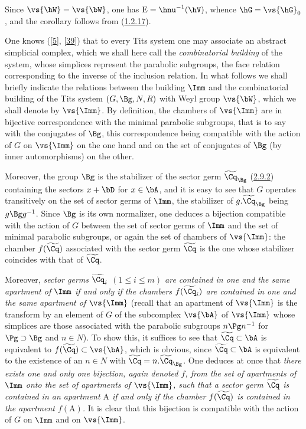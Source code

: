 \documentclass[12pt,a4paper,oneside,english]{smfart}
\makeatletter
\newcommand{\btanchor}[1]{\leavevmode\Hy@raisedlink{\hypertarget{bt:#1}{}}}
\newcommand{\btpageanchor}[1]{\Hy@raisedlink{\hypertarget{p:#1}{}}}
\newcommand{\btref}[1]{\hyperlink{bt:#1}{#1}}
\newcommand{\btbib}[1]{\hyperlink{bib:#1}{#1}}
\newcommand{\btpage}[1]{\marginnote{p.~#1}\btpageanchor{#1}}
\newcommand{\pg}[1]{\btpage{#1}}
\theoremstyle{definition}
\theoremstyle{bt}
\makeatother
\begin{document}
Since $\vs{\hW}=\vs{\bW}$, one has $\mathrm{E}=\hnu^{-1}(\hV)$, whence
$\hG=\vs{\hG}_{0}$, and the corollary follows from (\btref{1.2.17}).

\btanchor{5.1.33}
One knows ([\btbib{5}], [\btbib{39}]) that to every Tits system one may associate an abstract
simplicial complex, which we shall here call the \emph{combinatorial building}
of the system, whose simplices represent the parabolic subgroups, the face
relation corresponding to the inverse of the inclusion relation. In what follows
we shall briefly indicate the relations between the building $\Imm$ and the
combinatorial building of the Tits \pg{96}system $(G,\Bg,N,R)$ with Weyl group
$\vs{\bW}$, which we shall denote by $\vs{\Imm}$. By definition, the chambers of
$\vs{\Imm}$ are in bijective correspondence with the minimal parabolic
subgroups, that is to say with the conjugates of $\Bg$, this correspondence
being compatible with the action of $G$ on $\vs{\Imm}$ on the one hand and on
the set of conjugates of $\Bg$ (by inner automorphisms) on the other.

Moreover, the group $\Bg$ is the stabilizer of the sector germ
$\widetilde{\Cq}_{\Bg}$ (\btref{2.9.2}) containing the sectors $x+\bD$ for $x\in\bA$,
and it is easy to see that $G$ operates transitively on the set of sector germs
of $\Imm$, the stabilizer of $g.\widetilde{\Cq}_{\Bg}$ being $g\Bg g^{-1}$.
Since $\Bg$ is its own normalizer, one deduces a bijection compatible with the
action of $G$ between the set of sector germs of $\Imm$ and the set of minimal
parabolic subgroups, or again the set of chambers of $\vs{\Imm}$: the chamber
$f(\widetilde{\Cq})$ associated with the sector germ $\widetilde{\Cq}$ is the
one whose stabilizer coincides with that of $\widetilde{\Cq}$.

Moreover, \emph{sector germs $\widetilde{\Cq}_{i}$ $(1\leqslant i\leqslant m)$
are contained in one and the same apartment of $\Imm$ if and only if the
chambers $f(\widetilde{\Cq}_{i})$ are contained in one and the same apartment of
$\vs{\Imm}$} (recall that an apartment of $\vs{\Imm}$ is the transform by an
element of $G$ of the subcomplex $\vs{\bA}$ of $\vs{\Imm}$ whose simplices are
those associated with the parabolic subgroups $n\Pg n^{-1}$ for
$\Pg\supset\Bg$ and $n\in N$). To show this, it suffices to see that
$\widetilde{\Cq}\subset\bA$ is equivalent to $f(\widetilde{\Cq})\subset\vs{\bA}$,
which is obvious, since $\widetilde{\Cq}\subset\bA$ is equivalent to the
existence of an $n\in N$ with $\widetilde{\Cq}=n.\widetilde{\Cq}_{\Bg}$. One
deduces at once that \emph{there exists one and only one bijection, again
denoted $f$, from the set of apartments of $\Imm$ onto the set of apartments of
$\vs{\Imm}$, such that a sector germ $\widetilde{\Cq}$ is contained in an
apartment $\mathrm{A}$ if and only if the chamber $f(\widetilde{\Cq})$ is
contained in the apartment $f(\mathrm{A})$.} It is clear that this bijection is
compatible with the action of $G$ on $\Imm$ and on $\vs{\Imm}$.
\end{document}
